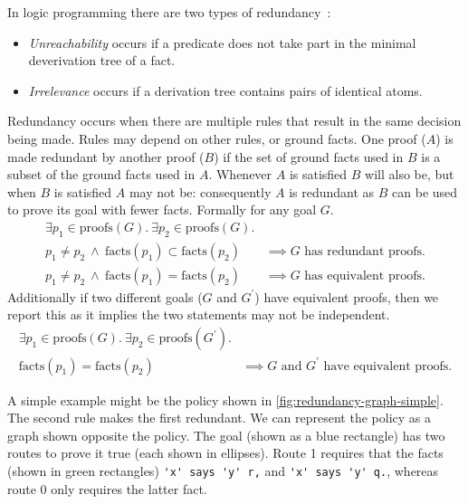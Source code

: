 \documentclass[a4paper]{scrartcl}
\begin{document}
In logic programming there are two types of redundancy~\cite{alon_levy_constraints_1992}:
\begin{itemize}
\item \emph{Unreachability} occurs if a predicate does not take part in the
  minimal deverivation tree of a fact.
\item \emph{Irrelevance} occurs if a derivation tree contains pairs of identical atoms.
\end{itemize}


Redundancy occurs when there are multiple rules that result in the same decision being
made.  Rules may depend on other rules, or ground facts.  One proof ($A$) is made
redundant by another proof ($B$) if the set of ground facts used in $B$ is a
subset of the ground facts used in $A$. Whenever $A$ is satisfied $B$ will also
be, but when $B$ is satisfied $A$ may not be: consequently $A$ is redundant as
$B$ can be used to prove its goal with fewer facts.
Formally for any goal $G$.
\begin{align*}
  \exists p_1 \in \text{proofs}(G).~\exists p_2 \in \text{proofs}(G).        & \\
  p_1 \not= p_2~\wedge~\text{facts}(p_1) \subset \text{facts}(p_2)           & \implies G\text{ has redundant proofs.} \\
  p_1 \not= p_2~\wedge~\text{facts}(p_1) = \text{facts}(p_2)                 & \implies G\text{ has equivalent proofs.}
\end{align*}
Additionally if two different goals ($G$ and $G^\prime$) have equivalent proofs, then we report this
as it implies the two statements may not be independent.
\begin{align*}
  \exists p_1 \in \text{proofs}(G).~\exists p_2 \in \text{proofs}(G^\prime). & \\
  \text{facts}(p_1) = \text{facts}(p_2)                                      & \implies \text{$G$ and $G^\prime$ have equivalent proofs.}
\end{align*}


A simple example might be the policy shown in \autoref{fig:redundancy-graph-simple}.
The second rule makes the first redundant.  We can represent the policy
as a graph shown opposite the policy.  The goal (shown as a blue rectangle) has two routes
to prove it true (each shown in ellipses).  Route 1 requires that the facts
(shown in green rectangles) \lstinline!'x' says 'y' r,! and
\lstinline!'x' says 'y' q.!, whereas route 0 only requires the
latter fact.
\end{document}
